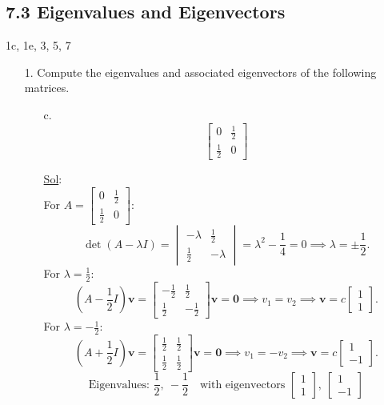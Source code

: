 \subsection*{7.3 Eigenvalues and Eigenvectors}

1c, 1e, 3, 5, 7

\begin{enumerate}
  \item[1.] Compute the eigenvalues and associated eigenvectors of
    the following matrices.
    \begin{enumerate}
      \item[c.] \[
          \begin{bmatrix}
            0 & \frac{1}{2} \\
            \frac{1}{2} & 0
          \end{bmatrix}
        \]

        \underline{Sol}:\\
        For \(A =
          \begin{bmatrix} 0 & \frac{1}{2} \\ \frac{1}{2} & 0
        \end{bmatrix}\):
        \[
          \det(A - \lambda I) =
          \begin{vmatrix} -\lambda & \frac{1}{2} \\ \frac{1}{2} & -\lambda
          \end{vmatrix} = \lambda^2 - \frac{1}{4} = 0 \implies
          \lambda = \pm \frac{1}{2}.
        \]
        For \(\lambda = \frac{1}{2}\):
        \[
          (A - \frac{1}{2}I)\mathbf{v} =
          \begin{bmatrix} -\frac{1}{2} & \frac{1}{2} \\ \frac{1}{2} &
            -\frac{1}{2}
          \end{bmatrix}\mathbf{v} = \mathbf{0} \implies v_1 = v_2
          \implies \mathbf{v} = c
          \begin{bmatrix} 1 \\ 1
          \end{bmatrix}.
        \]
        For \(\lambda = -\frac{1}{2}\):
        \[
          (A + \frac{1}{2}I)\mathbf{v} =
          \begin{bmatrix} \frac{1}{2} & \frac{1}{2} \\ \frac{1}{2} &
            \frac{1}{2}
          \end{bmatrix}\mathbf{v} = \mathbf{0} \implies v_1 = -v_2
          \implies \mathbf{v} = c
          \begin{bmatrix} 1 \\ -1
          \end{bmatrix}.
        \]
        \[
          \boxed{\text{Eigenvalues: } \frac{1}{2},\ -\frac{1}{2}
            \quad \text{with eigenvectors }
            \begin{bmatrix} 1 \\ 1
            \end{bmatrix},\
            \begin{bmatrix} 1 \\ -1
          \end{bmatrix}}
        \]


\end{enumerate}
\end{enumerate}
